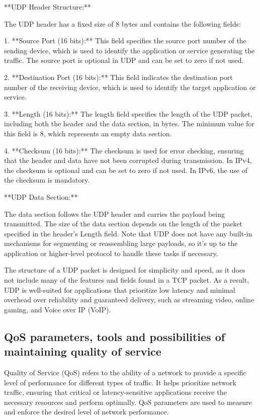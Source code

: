 \documentclass{article}
\begin{document}
**UDP Header Structure:**

The UDP header has a fixed size of 8 bytes and contains the following fields:

1. **Source Port (16 bits):** This field specifies the source port number of the sending device, which is used to identify the application or service generating the traffic. The source port is optional in UDP and can be set to zero if not used.

2. **Destination Port (16 bits):** This field indicates the destination port number of the receiving device, which is used to identify the target application or service.

3. **Length (16 bits):** The length field specifies the length of the UDP packet, including both the header and the data section, in bytes. The minimum value for this field is 8, which represents an empty data section.

4. **Checksum (16 bits):** The checksum is used for error checking, ensuring that the header and data have not been corrupted during transmission. In IPv4, the checksum is optional and can be set to zero if not used. In IPv6, the use of the checksum is mandatory.

**UDP Data Section:**

The data section follows the UDP header and carries the payload being transmitted. The size of the data section depends on the length of the packet specified in the header's Length field. Note that UDP does not have any built-in mechanisms for segmenting or reassembling large payloads, so it's up to the application or higher-level protocol to handle these tasks if necessary.

The structure of a UDP packet is designed for simplicity and speed, as it does not include many of the features and fields found in a TCP packet. As a result, UDP is well-suited for applications that prioritize low latency and minimal overhead over reliability and guaranteed delivery, such as streaming video, online gaming, and Voice over IP (VoIP).


\subsection{QoS parameters, tools and possibilities of maintaining quality of service}

Quality of Service (QoS) refers to the ability of a network to provide a specific level of performance for different types of traffic. It helps prioritize network traffic, ensuring that critical or latency-sensitive applications receive the necessary resources and perform optimally. QoS parameters are used to measure and enforce the desired level of network performance.
\end{document}
